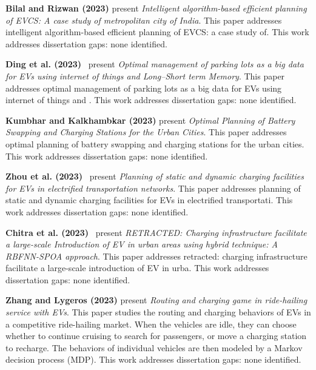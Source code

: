 \documentclass[letterpaper, 12pt, oneside, doublespacing]{Thesis}
\begin{document}
\noindent \textbf{Bilal and Rizwan (2023)} present \textit{Intelligent algorithm-based efficient planning of EVCS: A case study of metropolitan city of India}. This paper addresses intelligent algorithm-based efficient planning of EVCS: a case study of. This work addresses dissertation gaps: none identified.



\noindent \textbf{Ding et al. (2023)}~\cite{optimal_management_2023} present \textit{Optimal management of parking lots as a big data for EVs using internet of things and Long--Short term Memory}. This paper addresses optimal management of parking lots as a big data for EVs using internet of things and . This work addresses dissertation gaps: none identified.



\noindent \textbf{Kumbhar and Kalkhambkar (2023)} present \textit{Optimal Planning of Battery Swapping and Charging Stations for the Urban Cities}. This paper addresses optimal planning of battery swapping and charging stations for the urban cities. This work addresses dissertation gaps: none identified.



\noindent \textbf{Zhou et al. (2023)}~\cite{planning_of_2023} present \textit{Planning of static and dynamic charging facilities for EVs in electrified transportation networks}. This paper addresses planning of static and dynamic charging facilities for EVs in electrified transportati. This work addresses dissertation gaps: none identified.



\noindent \textbf{Chitra et al. (2023)}~\cite{retracted_charging_2023} present \textit{RETRACTED: Charging infrastructure facilitate a large-scale Introduction of EV in urban areas using hybrid technique: A RBFNN-SPOA approach}. This paper addresses retracted: charging infrastructure facilitate a large-scale introduction of EV in urba. This work addresses dissertation gaps: none identified.



\noindent \textbf{Zhang and Lygeros (2023)} present \textit{Routing and charging game in ride-hailing service with EVs}. This paper studies the routing and charging behaviors of EVs in a competitive ride-hailing market. When the vehicles are idle, they can choose whether to continue cruising to search for passengers, or move a charging station to recharge. The behaviors of individual vehicles are then modeled by a Markov decision process (MDP). This work addresses dissertation gaps: none identified.
\end{document}
